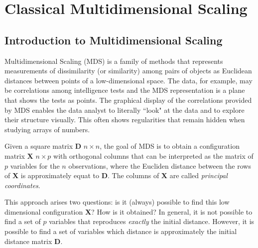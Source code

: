\documentclass[11pt]{report}
\begin{document}




\thispagestyle{empty}






\clearpage



\tableofcontents



\chapter{Classical Multidimensional Scaling}
\section{Introduction to Multidimensional Scaling}
Multidimensional Scaling (MDS) is a family of methods that represents 
measurements of dissimilarity (or similarity) among pairs of objects as 
Euclidean distances between points of a low-dimensional space. The data, 
for example, may be correlations among intelligence tests and the MDS 
representation is a plane that shows the tests as points. The graphical display 
of the correlations provided by MDS enables the data analyst to literally 
``look" at the data and to explore their structure visually. This often shows 
regularities that remain hidden when studying arrays of numbers. 

\indent Given a square matrix \textbf{D} $n\times n$, the goal of MDS is to 
obtain a configuration matrix \textbf{X} $n \times p$ with orthogonal columns
that can be interpreted as the matrix of $p$ variables for the $n$ 
observations, where the Eucliden distance between the rows of \textbf{X} 
is approximately equat to \textbf{D}. The columns of \textbf{X} are called 
\textit{principal coordinates}.

\indent This approach arises two questions: is it (always) possible to find this
low dimensional configuration \textbf{X}? How is it obtained? In general, it 
is not possible to find a set of $p$ variables that reproduces 
\textit{exactly} the initial distance. However, it is possible to find a set 
of variables which distance is approximately the initial distance matrix 
\textbf{D}.
\end{document}
